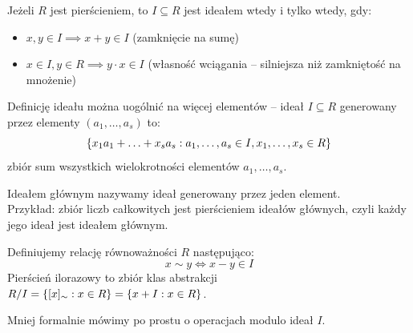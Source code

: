 \begin{definition}[Ideał]
	Jeżeli \( R \) jest pierścieniem, to \( I \subseteq R \) jest ideałem wtedy i tylko wtedy, gdy:
	\begin{itemize}
		\item \( x, y \in I \implies x + y \in I \) (zamknięcie na sumę)
		\item \( x \in I, y \in R \implies y\cdot x \in I \) (własność wciągania -- silniejsza niż zamkniętość na mnożenie)
	\end{itemize}
\end{definition}
Definicję ideału można uogólnić na więcej elementów -- ideał \( I \subseteq R \) generowany przez elementy \( (a_1, \ldots, a_s) \) to:
\[
	\set{ x_1 a_1 + \ldots + x_s a_s : a_1, \ldots, a_s \in I, x_1, \ldots, x_s \in R}
\]
zbiór sum wszystkich wielokrotności elementów \( a_1, \ldots, a_s \).

Ideałem głównym nazywamy ideał generowany przez jeden element. \\
Przykład: zbiór liczb całkowitych jest pierścieniem ideałów głównych, czyli każdy jego ideał jest ideałem głównym.

\begin{definition}
	Definiujemy relację równoważności \( R \) następująco:
	\[
		x \sim y \iff x - y \in I
	\]
	Pierścień ilorazowy to zbiór klas abstrakcji \( R/I = \set{[x]_{\sim} : x \in R} = \set{x + I : x \in R} \).
\end{definition}
Mniej formalnie mówimy po prostu o operacjach modulo ideał \( I \).

